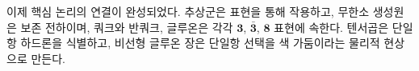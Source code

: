 이제 핵심 논리의 연결이 완성되었다. 추상군은 표현을 통해 작용하고, 무한소 생성원은 보존 전하이며, 쿼크와 반쿼크, 글루온은 각각 \(\boldsymbol 3\), \(\bar{\boldsymbol 3}\), \(\boldsymbol 8\) 표현에 속한다. 텐서곱은 단일항 하드론을 식별하고, 비선형 글루온 장은 단일항 선택을 색 가둠이라는 물리적 현상으로 만든다.
